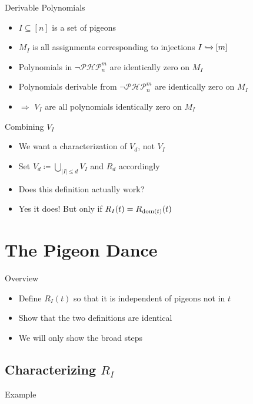 \documentclass[xcolor={dvipsnames}, aspectratio=169, handout]{beamer}
\newcommand{\PHP}{\ensuremath{\neg \mathcal{PHP}^m_n}\xspace}
\begin{document}
\begin{frame}{Derivable Polynomials}
    \begin{itemize}[<+->]
        \item $I \subseteq [n]$ is a set of pigeons
        \item $M_I$ is all assignments corresponding to injections $I \xhookrightarrow{} [m]$
        \item Polynomials in \PHP are identically zero on $M_I$
        \item Polynomials derivable from \PHP are identically zero on $M_I$
        \item[] $\Rightarrow$ $V_I$ are all polynomials identically zero on $M_I$
    \end{itemize}
\end{frame}

\begin{frame}{Combining $V_I$}
    \begin{itemize}[<+->]
        \item We want a characterization of $V_d$, not $V_I$
        \item Set $V_d \coloneqq \bigcup_{|I| \leq d} V_I$ and $R_d$ accordingly
        \item Does this definition actually work?
        \item Yes it does! But only if $R_I(t) = R_{\operatorname{dom}(t)}(t)$
    \end{itemize}
\end{frame}

\section{The Pigeon Dance}
\begin{frame}{Overview}
    \begin{itemize}[<+->]
        \item Define $R_I(t)$ so that it is independent of pigeons not in $t$
        \item Show that the two definitions are identical
        \item We will only show the broad steps
    \end{itemize}
\end{frame}

\subsection{Characterizing \texorpdfstring{$R_I$}{RI}}
\begin{frame}{Example}
    
\end{frame}
\end{document}
